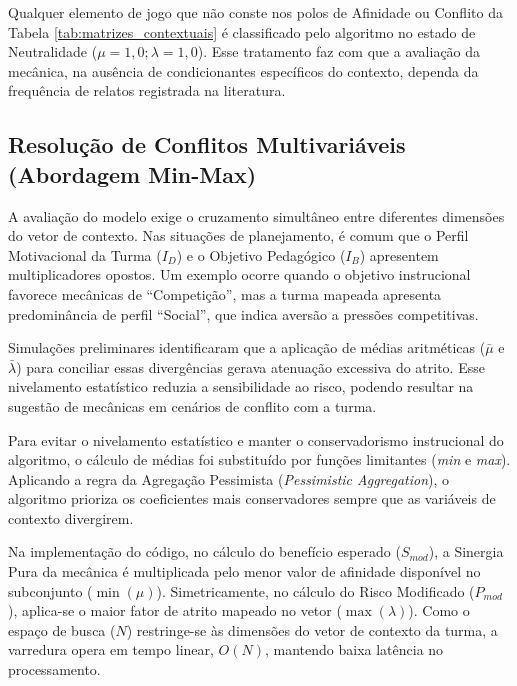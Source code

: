Qualquer elemento de jogo que não conste nos polos de Afinidade ou Conflito da Tabela \ref{tab:matrizes_contextuais} é classificado pelo algoritmo no estado de Neutralidade ($\mu=1,0; \lambda=1,0$). Esse tratamento faz com que a avaliação da mecânica, na ausência de condicionantes específicos do contexto, dependa da frequência de relatos registrada na literatura.


\subsection{Resolução de Conflitos Multivariáveis (Abordagem Min-Max)}

A avaliação do modelo exige o cruzamento simultâneo entre diferentes dimensões do vetor de contexto. Nas situações de planejamento, é comum que o Perfil Motivacional da Turma ($I_D$) e o Objetivo Pedagógico ($I_B$) apresentem multiplicadores opostos. Um exemplo ocorre quando o objetivo instrucional favorece mecânicas de ``Competição'', mas a turma mapeada apresenta predominância de perfil ``Social'', que indica aversão a pressões competitivas.

Simulações preliminares identificaram que a aplicação de médias aritméticas ($\bar{\mu}$ e $\bar{\lambda}$) para conciliar essas divergências gerava atenuação excessiva do atrito. Esse nivelamento estatístico reduzia a sensibilidade ao risco, podendo resultar na sugestão de mecânicas em cenários de conflito com a turma.

Para evitar o nivelamento estatístico e manter o conservadorismo instrucional do algoritmo, o cálculo de médias foi substituído por funções limitantes (\textit{min} e \textit{max}). Aplicando a regra da Agregação Pessimista (\textit{Pessimistic Aggregation}), o algoritmo prioriza os coeficientes mais conservadores sempre que as variáveis de contexto divergirem.

Na implementação do código, no cálculo do benefício esperado ($S_{mod}$), a Sinergia Pura da mecânica é multiplicada pelo menor valor de afinidade disponível no subconjunto ($\min(\mu)$). Simetricamente, no cálculo do Risco Modificado ($P_{mod}$), aplica-se o maior fator de atrito mapeado no vetor ($\max(\lambda)$). Como o espaço de busca ($N$) restringe-se às dimensões do vetor de contexto da turma, a varredura opera em tempo linear, $O(N)$, mantendo baixa latência no processamento.

